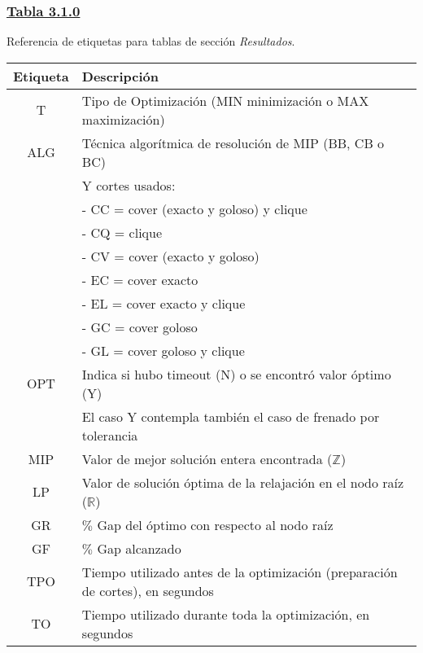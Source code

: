 \subsubsection*{\underline{Tabla 3.1.0}}

\noindent Referencia de etiquetas para tablas de sección \emph{Resultados}.\\

{
\centering
\begin{tabular}{c p{10cm}}
\\
\hline
\textbf{Etiqueta} & \textbf{Descripción}\\
\hline
T & Tipo de Optimización (MIN minimización o MAX maximización)\\
\hline
ALG & Técnica algorítmica de resolución de MIP (BB, CB o BC)\\
& Y cortes usados: \\
& \hspace{5mm} - CC = cover (exacto y goloso) y clique\\
& \hspace{5mm} -  CQ = clique\\
& \hspace{5mm} -  CV = cover (exacto y goloso)\\
& \hspace{5mm} -  EC = cover exacto\\
& \hspace{5mm} -  EL = cover exacto y clique\\
& \hspace{5mm} -  GC = cover goloso\\
& \hspace{5mm} -  GL = cover goloso y clique\\
\hline
OPT & Indica si hubo timeout (N) o se encontró valor óptimo (Y) \\
& El caso Y contempla también el caso de frenado por tolerancia\\
\hline
MIP & Valor de mejor solución entera encontrada ($\mathbb{Z}$)\\
\hline
LP & Valor de solución óptima de la relajación en el nodo raíz ($\mathbb{R}$)\\
\hline
GR & $\%$ Gap del óptimo con respecto al nodo raíz\\
\hline
GF & $\%$ Gap alcanzado\\
\hline
TPO & Tiempo utilizado antes de la optimización (preparación de cortes), en segundos\\
\hline
TO & Tiempo utilizado durante toda la optimización, en segundos\\

\end{tabular}}
